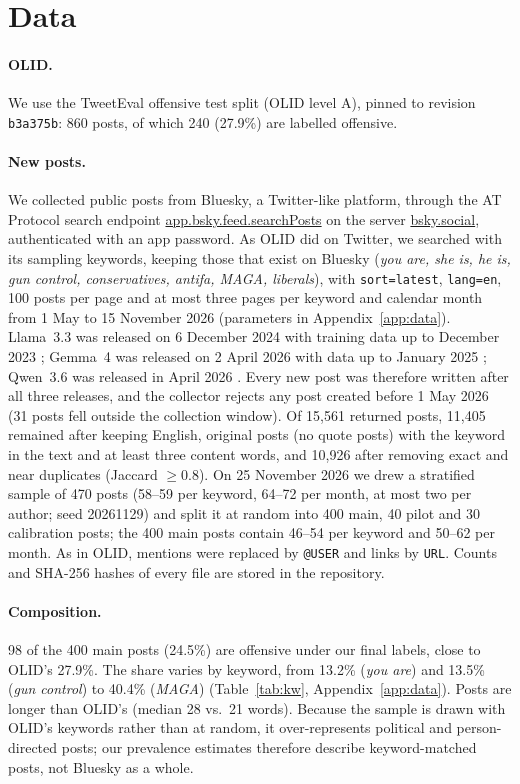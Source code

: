\documentclass[11pt]{article}
\begin{document}
\section{Data}

\paragraph{OLID.} We use the TweetEval offensive test split (OLID level A), pinned to revision \texttt{b3a375b}: 860 posts, of which 240 (27.9\%) are labelled offensive.

\paragraph{New posts.} We collected public posts from Bluesky, a Twitter-like platform, through the AT Protocol search endpoint \url{app.bsky.feed.searchPosts} on the server \url{bsky.social}, authenticated with an app password. As OLID did on Twitter, we searched with its sampling keywords, keeping those that exist on Bluesky (\emph{you are, she is, he is, gun control, conservatives, antifa, MAGA, liberals}), with \texttt{sort=latest}, \texttt{lang=en}, 100 posts per page and at most three pages per keyword and calendar month from 1 May to 15 November 2026 (parameters in Appendix~\ref{app:data}). Llama~3.3 was released on 6 December 2024 with training data up to December 2023 \citep{meta2024llama33}; Gemma~4 was released on 2 April 2026 with data up to January 2025 \citep{gemma2026gemma4}; Qwen~3.6 was released in April 2026 \citep{qwen2026qwen36}. Every new post was therefore written after all three releases, and the collector rejects any post created before 1 May 2026 (31 posts fell outside the collection window). Of 15,561 returned posts, 11,405 remained after keeping English, original posts (no quote posts) with the keyword in the text and at least three content words, and 10,926 after removing exact and near duplicates (Jaccard $\geq 0.8$). On 25 November 2026 we drew a stratified sample of 470 posts (58--59 per keyword, 64--72 per month, at most two per author; seed 20261129) and split it at random into 400 main, 40 pilot and 30 calibration posts; the 400 main posts contain 46--54 per keyword and 50--62 per month. As in OLID, mentions were replaced by \texttt{@USER} and links by \texttt{URL}. Counts and SHA-256 hashes of every file are stored in the repository.

\paragraph{Composition.} 98 of the 400 main posts (24.5\%) are offensive under our final labels, close to OLID's 27.9\%. The share varies by keyword, from 13.2\% (\emph{you are}) and 13.5\% (\emph{gun control}) to 40.4\% (\emph{MAGA}) (Table~\ref{tab:kw}, Appendix~\ref{app:data}). Posts are longer than OLID's (median 28 vs.\ 21 words). Because the sample is drawn with OLID's keywords rather than at random, it over-represents political and person-directed posts; our prevalence estimates therefore describe keyword-matched posts, not Bluesky as a whole.
\end{document}
